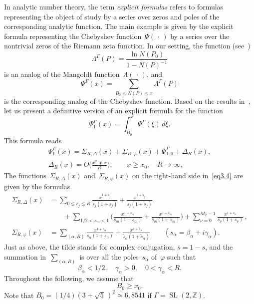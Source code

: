 \documentclass{amsart}
\theoremstyle{plain}
\theoremstyle{definition}
\numberwithin{equation}{section}
\begin{document}
In analytic number theory, the term \textit{explicit formulas}
refers to formulas representing the object of study by a series
over zeros and poles of the corresponding analytic function. The
main example is given by the explicit formula representing the
Chebyshev function~$\Psi(\,\cdot\,)$ by a series over the
nontrivial zeros of the Riemann zeta function. In our setting, the
function (see~\cite{14,15})
\begin{equation}
 \label{eq3.1}
\Lambda^\Gamma(P)=\frac{\ln N(P_0)}{1-N(P)^{-1}}
\end{equation}
is an analog of the Mangoldt function~$\Lambda(\,\cdot\,)$, and
\begin{equation}
 \label{eq3.2}
\Psi^\Gamma(x)=\sum_{B_0\leqslant N(P)\leqslant x}\Lambda^\Gamma(P)
\end{equation}
is the corresponding analog of the Chebyshev function. Based on the
results in~\cite{15,16}, let us present a definitive version of an
explicit formula for the function
\begin{equation}
\label{eq3.3}
\Psi_1^\Gamma(x)=\int_{B_0}^x\Psi^\Gamma(\xi)\,d\xi.
\end{equation}
This formula reads
\begin{equation}
\label{eq3.4}
\begin{gathered}
\Psi_1^\Gamma(x)=\Sigma_{R,\Delta}(x)+\Sigma_{R,\varphi}(x)+
\Psi^\Gamma_{1,0}+\Delta_R(x),
\\
\Delta_R(x)=O\biggl(\frac{x^2\ln x}R\biggr),\qquad
x\geqslant x_0,\quad
R\to\infty,
\end{gathered}
\end{equation}
The functions~$\Sigma_{R,\Delta}(x)$ and~$\Sigma_{R,\varphi}(x)$ on
the right-hand side in~\eqref{eq3.4} are given by the formulas
\begin{align}
\Sigma_{R,\Delta}(x)&=\sum_{0\leqslant r_j\leqslant R}
\frac{x^{1+s_j}}{s_j(1+s_j)}+
\frac{x^{1+\tilde s_j}}{\tilde s_j(1+\tilde s_j)}
\nonumber
\\
&\qquad+\sum_{1/2<s_m<1}\biggl(\frac{x^{1+s_m}}{s_m(1+s_m)}+
\frac{x^{1+\overline s_m}}{\overline s_m(1+\overline s_m)}\biggr)
+\sum_{\nu=0}^{M_2-1}\frac{x^{1+s_\nu}}{s_\nu(1+s_\nu)}\,,
\label{eq3.5}
\\
\Sigma_{R,\varphi}(x)&=\sum_{(\alpha,R)}
\frac{x^{1+s_\alpha}}{s_\alpha(1+s_\alpha)}+
\frac{x^{1+\tilde s_\alpha}}{\tilde s_\alpha(1+\tilde s_\alpha)}\qquad
(s_\alpha=\beta_\alpha+i\gamma_\alpha).
\label{eq3.6}
\end{align}
Just as above, the tilde stands for complex conjugation,
$\overline{s}=1-s$, and the summation in~$\sum_{(\alpha,R)}$ is
over all the poles~$s_\alpha$ of~$\varphi$ such that
\begin{equation}
\label{eq3.7}
\beta_\alpha<1/2,\quad
\gamma_\alpha>0,\quad
0<\gamma_\alpha<R.
\end{equation}
Throughout the following, we assume that
\begin{equation}
\label{eq3.8}
B_0\geqslant x_0.
\end{equation}
Note that $B_0=(1/4)(3+\sqrt5\,)^2\simeq6,8541$ if
$\Gamma=\operatorname{SL}(2,\mathbb{Z})$.
\end{document}
